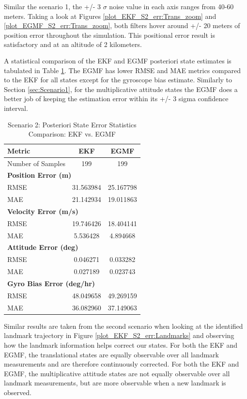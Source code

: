 \documentclass[conf]{new-aiaa}
\begin{document}
Similar the scenario 1, the +/- 3 $\sigma$ noise value in each axis ranges from 40-60 meters. Taking a look at Figures \ref{plot_EKF_S2_err:Trans_zoom} and \ref{plot_EGMF_S2_err:Trans_zoom}, both filters hover around +/- 20 meters of position error throughout the simulation. This positional error result is satisfactory and at an altitude of 2 kilometers. 


A statistical comparison of the EKF and EGMF posteriori state estimates is tabulated in Table \ref{tab:S2_egmf_ekf_stats_200s}. The EGMF has lower RMSE and MAE metrics compared to the EKF for all states except for the gyroscope bias estimate. Similarly to Section \ref{sec:Scenario1}, for the multiplicative attitude states the EGMF does a better job of keeping the estimation error within its +/- 3 sigma confidence interval.

\newpage
\begin{table}[thbp]
\centering
\begin{tabular}{lcc}
\hline
\textbf{Metric} & \textbf{EKF} & \textbf{EGMF} \\
\hline
Number of Samples & 199 & 199 \\
\hline
\multicolumn{3}{l}{\textbf{Position Error (m)}} \\
RMSE & 31.563984 & 25.167798 \\
MAE  & 21.142934 & 19.011863 \\
\hline
\multicolumn{3}{l}{\textbf{Velocity Error (m/s)}} \\
RMSE & 19.746426 & 18.404141 \\
MAE  & 5.536428  & 4.894668 \\
\hline
\multicolumn{3}{l}{\textbf{Attitude Error (deg)}} \\
RMSE & 0.046271 & 0.033282 \\
MAE  & 0.027189 & 0.023743 \\
\hline
\multicolumn{3}{l}{\textbf{Gyro Bias Error (deg/hr)}} \\
RMSE & 48.049658 & 49.269159 \\
MAE  & 36.082960 & 37.149063 \\
\hline
\end{tabular}
\caption{Scenario 2: Posteriori State Error Statistics Comparison: EKF vs. EGMF}
\label{tab:S2_egmf_ekf_stats_200s}
\end{table}


Similar results are taken from the second scenario when looking at the identified landmark trajectory in Figure \ref{plot_EKF_S2_err:Landmarks} and observing how the landmark information helps correct our states. For both the EKF and EGMF, the translational states are equally observable over all landmark measurements and are therefore continuously corrected. For both the EKF and EGMF, the multiplicative attitude states are not equally observable over all landmark measurements, but are more observable when a new landmark is observed. 
\end{document}
